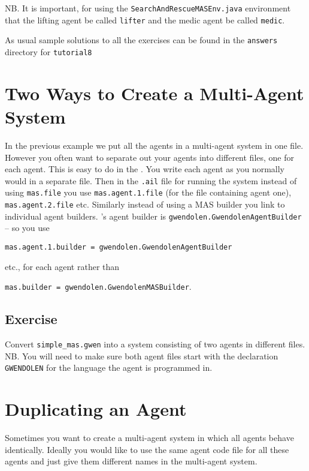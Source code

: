 \documentclass[a4]{article}
\begin{document}
NB. It is important, for using the \texttt{SearchAndRescueMASEnv.java} environment that the lifting agent be called \texttt{lifter} and the medic agent be called \texttt{medic}.

As usual sample solutions to all the exercises can be found in the \texttt{answers} directory for \texttt{tutorial8}

\section{Two Ways to Create a Multi-Agent System}

In the previous example we put all the agents in a multi-agent system in one file.  However you often want to separate out your agents into different files, one for each agent.  This is easy to do in the \ail.  You write each agent as you normally would in a separate file.  Then in the \texttt{.ail} file for running the system instead of using \texttt{mas.file} you use \texttt{mas.agent.1.file} (for the file containing agent one), \texttt{mas.agent.2.file} etc.  Similarly instead of using a MAS builder you link to individual agent builders.  \gwendolen's agent builder is \texttt{gwendolen.GwendolenAgentBuilder} -- so you use 
\begin{center}
\texttt{mas.agent.1.builder = gwendolen.GwendolenAgentBuilder} 
\end{center}
etc., for each agent rather than 
\begin{center}
\texttt{mas.builder = gwendolen.GwendolenMASBuilder}.
\end{center}

\subsection{Exercise}
Convert \texttt{simple\_mas.gwen} into a system consisting of two agents in different files.  NB.  You will need to make sure both agent files start with the declaration \texttt{GWENDOLEN} for the language the agent is programmed in.

\section{Duplicating an Agent}

Sometimes you want to create a multi-agent system in which all agents behave identically.  Ideally you would like to use the same agent code file for all these agents and just give them different names in the multi-agent system.
\end{document}
